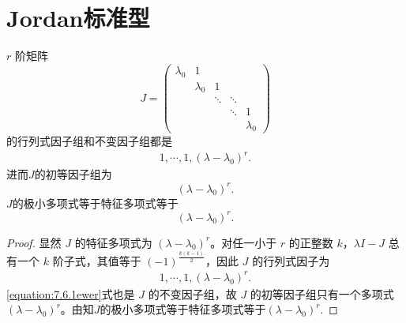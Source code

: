\documentclass[../../main.tex]{subfiles}
\begin{document}
\section{Jordan标准型}

\begin{lemma}\label{lemma:Jordan块的初等因子组}
$r$ 阶矩阵
\[
J = \begin{pmatrix}
\lambda_0 & 1 & & & \\
& \lambda_0 & 1 & & \\
& & \ddots & \ddots & \\
& & & \ddots & 1 \\
& & & & \lambda_0
\end{pmatrix}
\]
的行列式因子组和不变因子组都是
\begin{align*}
1,\cdots,1,(\lambda - \lambda_0)^r.
\end{align*}
进而$J$的初等因子组为
$$
(\lambda - \lambda_0)^r.
$$
$J$的极小多项式等于特征多项式等于
$$
(\lambda - \lambda_0)^r.
$$
\end{lemma}
\begin{proof}
显然 $J$ 的特征多项式为 $(\lambda - \lambda_0)^r$。对任一小于 $r$ 的正整数 $k$，$\lambda I - J$ 总有一个 $k$ 阶子式，其值等于 $(-1)^{\frac{k(k-1)}{2}}$，因此 $J$ 的行列式因子为
\begin{align}
1,\cdots,1,(\lambda - \lambda_0)^r.
\label{equation:7.6.1ewer}
\end{align}
\eqref{equation:7.6.1ewer}式也是 $J$ 的不变因子组，故 $J$ 的初等因子组只有一个多项式 $(\lambda - \lambda_0)^r$。由知$J$的极小多项式等于特征多项式等于$(\lambda - \lambda_0)^r.$

\end{proof}
\end{document}
